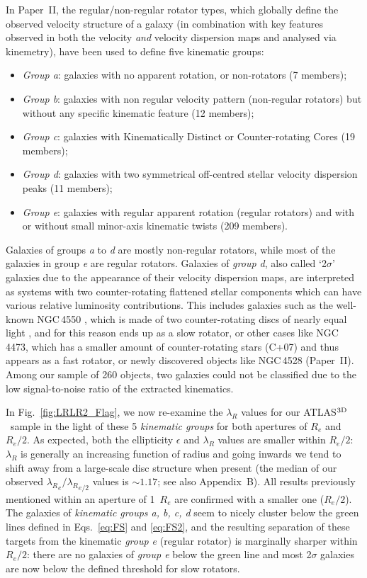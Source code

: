 \documentclass[useAMS,usenatbib,usegraphicx]{mn2e}
\newcommand{\atlas}{{ATLAS$^{\rm 3D}$}}
\begin{document}
In Paper~II, the regular/non-regular rotator types, which globally define
the observed velocity structure of a galaxy (in combination
with key features observed in both the velocity {\em and} velocity dispersion
maps and analysed via kinemetry), have been used to define five kinematic groups:
\begin{itemize}
   \item {\em Group a}: galaxies with no apparent rotation, or non-rotators (7 members);
   \item {\em Group b}: galaxies with non regular velocity pattern (non-regular
      rotators) but without any specific kinematic feature (12 members);
   \item {\em Group c}: galaxies with Kinematically Distinct or Counter-rotating Cores (19 members);
   \item {\em Group d}: galaxies with two symmetrical off-centred stellar velocity dispersion peaks (11 members);
   \item {\em Group e}: galaxies with regular apparent rotation (regular rotators) and with or
      without small minor-axis kinematic twists (209 members).
\end{itemize}
Galaxies of groups {\em a} to {\em d} are mostly non-regular rotators, while most of the galaxies
in group {\em e} are regular rotators. Galaxies of {\em group d}, also called `2$\sigma$'
galaxies due to the appearance of their velocity dispersion maps, 
are interpreted as systems with two counter-rotating 
flattened stellar components which can have various relative luminosity
contributions. This includes galaxies such as the well-known NGC\,4550
\citep{Rubin+92}, which is made of two counter-rotating discs of nearly equal
light \citep[][C+07]{Rix+92}, and for this reason ends up as a slow
rotator, or other cases like NGC\,4473, which has a smaller amount of
counter-rotating stars (C+07) and thus appears as a fast rotator,
or newly discovered objects like NGC\,4528 (Paper~II). 
Among our sample of 260 objects, two galaxies could not be classified due
to the low signal-to-noise ratio of the extracted kinematics.

In Fig.~\ref{fig:LRLR2_Flag}, we now re-examine the $\lambda_R$ values for our \atlas\ sample in the light
of these 5 {\em kinematic groups} for both apertures of $R_e$ and $R_e / 2$. As
expected, both the ellipticity $\epsilon$ and $\lambda_R$ values are smaller
within $R_e/2$: $\lambda_R$ is generally an increasing function of radius
and going inwards we tend to shift away from a large-scale disc structure when
present (the median of our observed  ${\lambda_R}_e / {\lambda_R}_{e/2}$ values
is $\sim 1.17$; see also Appendix~B). All results previously mentioned within an
aperture of 1~$R_e$ are confirmed with a smaller one ($R_e/2$). The
galaxies of {\em kinematic groups  a, b, c, d} seem to nicely cluster below the
green lines defined in Eqs.~\ref{eq:FS} and \ref{eq:FS2}, and the resulting separation of these
targets from the kinematic {\em group e} (regular rotator) is marginally sharper within
$R_e /2$: there are no galaxies of {\em group e} below the green line and 
most 2$\sigma$ galaxies are now below the defined threshold for slow rotators. 
\end{document}
